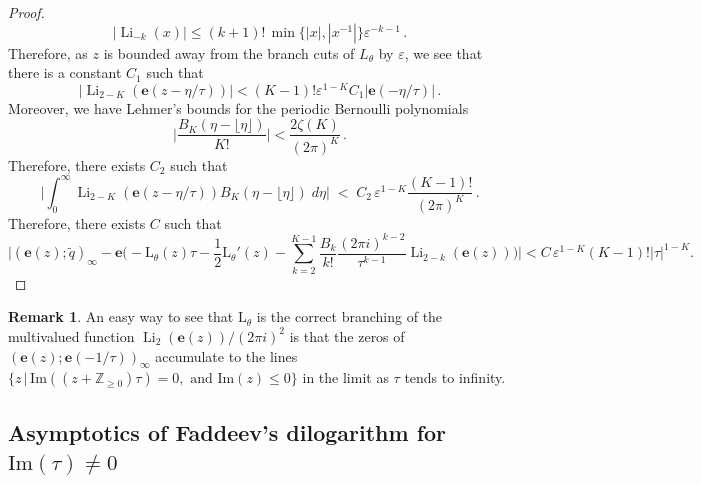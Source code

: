 \documentclass[12pt,reqno]{amsart}
\theoremstyle{definition}
\newtheorem{remark}[theorem]{Remark}
\def\BZ{\mathbb Z}
\def\Im{\mathrm{Im}}
\def\be{\begin{equation}}
\def\ee{\end{equation}}
\def\z{\zeta}
\def\e{\mathbf e}
\renewcommand{\=}{\;=\;}
\newcommand{\tq}{\widetilde q}
\newcommand{\Li}{\operatorname{Li}}
\begin{document}
\begin{proof}
\be
  |\Li_{-k}(x)|
  \leq
  (k+1)!\,\min\{|x|,|x^{-1}|\}\varepsilon^{-k-1}\,.
\ee
Therefore, as $z$ is bounded away from the branch cuts of $L_{\theta}$ by $\varepsilon$, we see that there is a constant $C_1$ such that
\be\label{eq:bound.polylog}
    |\Li_{2-K}(\e(z-\eta/\tau))|
    <
    (K-1)!\varepsilon^{1-K}C_1|\e(-\eta/\tau)|\,.
\ee
Moreover, we have Lehmer's bounds for the periodic Bernoulli polynomials
\be
  \Big|\frac{B_{K}(\eta-\lfloor \eta\rfloor)}{K!}\Big|
  <
  \frac{2\z(K)}{(2\pi)^K}\,.
\ee
Therefore, there exists $C_2$ such that
\be
  \Big|\int_{0}^{\infty}\Li_{2-K}(\e(z-\eta/\tau))B_{K}(\eta-\lfloor \eta\rfloor)\;d\eta\Big|
  \;<\;C_2\,\varepsilon^{1-K}\frac{(K-1)!}{(2\pi)^K}\,.
\ee
Therefore, there exists $C$ such that
\be
\Big|(\e(z);\tq)_{\infty}
    -
    \e\Big(-\mathrm{L}_{\theta}(z)\tau
    -
    \frac{1}{2}\mathrm{L}_{\theta}'(z)
    -
    \sum_{k=2}^{K-1}\frac{B_k}{k!}\frac{(2\pi i)^{k-2}}{\tau^{k-1}}\Li_{2-k}(\e(z))\Big)
    \Big|
    <
    C\,\varepsilon^{1-K}(K-1)!|\tau|^{1-K}.
\ee
\end{proof}
\begin{remark}
An easy way to see that $\mathrm{L}_{\theta}$ is the correct branching of the multivalued function $\Li_{2}(\e(z))/(2\pi i)^2$ is that the zeros of $(\e(z);\e(-1/\tau))_{\infty}$ accumulate to the lines $\{z\,|\,\Im((z+\BZ_{\geq0})\tau)=0,\text{ and }\Im(z)\leq0\}$ in the limit as $\tau$ tends to infinity.
\end{remark}

\subsection{\texorpdfstring{Asymptotics of Faddeev's dilogarithm for $\Im(\tau)\neq0$}{Asymptotics of Faddeev's dilogarithm for Im(tau)=/=0}}
\end{document}
